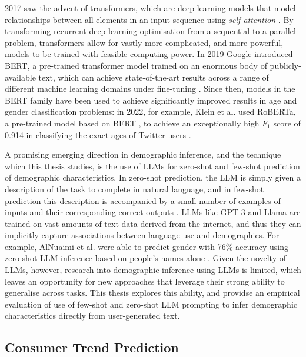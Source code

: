 \documentclass{report}
\begin{document}
2017 saw the advent of transformers, which are deep learning models that model relationships between all elements in an input sequence using \textit{self-attention} \cite{vaswani-2017-attention-is-all-you-need}. By transforming recurrent deep learning optimisation from a sequential to a parallel problem, transformers allow for vastly more complicated, and more powerful, models to be trained with feasible computing power. In 2019 Google introduced BERT, a pre-trained transformer model trained on an enormous body of publicly-available text, which can achieve state-of-the-art results across a range of different machine learning domains under fine-tuning \cite{devlin-etal-2019-bert}. Since then, models in the BERT family have been used to achieve significantly improved results in age and gender classification problems: in 2022, for example, Klein et al. used RoBERTa, a pre-trained model based on BERT \cite{liu2019roberta}, to achieve an exceptionally high $F_1$ score of 0.914 in classifying the exact ages of Twitter users \cite{klein2022reportage}.

A promising emerging direction in demographic inference, and the technique which this thesis studies, is the use of LLMs for zero-shot and few-shot prediction of demographic characteristics. In zero-shot prediction, the LLM is simply given a description of the task to complete in natural language, and in few-shot prediction this description is accompanied by a small number of examples of inputs and their corresponding correct outputs \cite{NEURIPS2020_1457c0d6}. LLMs like GPT-3 and Llama are trained on vast amounts of text data derived from the internet, and thus they can implicitly capture associations between language use and demographics. For example, AlNuaimi et al. were able to predict gender with 76\% accuracy using zero-shot LLM inference based on people's names alone \cite{alnuaimi2024enriching}. Given the novelty of LLMs, however, research into demographic inference using LLMs is limited, which leaves an opportunity for new approaches that leverage their strong ability to generalise across tasks. This thesis explores this ability, and providse an empirical evaluation of use of few-shot and zero-shot LLM prompting to infer demographic characteristics directly from user-generated text.


\subsection{Consumer Trend Prediction}
\end{document}
